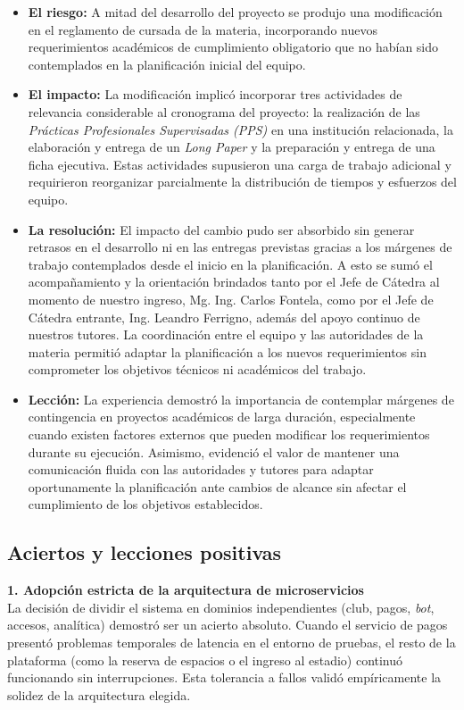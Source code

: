 \begin{itemize}
    \item \textbf{El riesgo:} A mitad del desarrollo del proyecto se produjo una modificación en el reglamento de cursada de la materia, incorporando nuevos requerimientos académicos de cumplimiento obligatorio que no habían sido contemplados en la planificación inicial del equipo.
    \item \textbf{El impacto:} La modificación implicó incorporar tres actividades de relevancia considerable al cronograma del proyecto: la realización de las \textit{Prácticas Profesionales Supervisadas (PPS)} en una institución relacionada, la elaboración y entrega de un \textit{Long Paper} y la preparación y entrega de una ficha ejecutiva. Estas actividades supusieron una carga de trabajo adicional y requirieron reorganizar parcialmente la distribución de tiempos y esfuerzos del equipo.
    \item \textbf{La resolución:} El impacto del cambio pudo ser absorbido sin generar retrasos en el desarrollo ni en las entregas previstas gracias a los márgenes de trabajo contemplados desde el inicio en la planificación. A esto se sumó el acompañamiento y la orientación brindados tanto por el Jefe de Cátedra al momento de nuestro ingreso, Mg. Ing. Carlos Fontela, como por el Jefe de Cátedra entrante, Ing. Leandro Ferrigno, además del apoyo continuo de nuestros tutores. La coordinación entre el equipo y las autoridades de la materia permitió adaptar la planificación a los nuevos requerimientos sin comprometer los objetivos técnicos ni académicos del trabajo.
    \item \textbf{Lección:} La experiencia demostró la importancia de contemplar márgenes de contingencia en proyectos académicos de larga duración, especialmente cuando existen factores externos que pueden modificar los requerimientos durante su ejecución. Asimismo, evidenció el valor de mantener una comunicación fluida con las autoridades y tutores para adaptar oportunamente la planificación ante cambios de alcance sin afectar el cumplimiento de los objetivos establecidos.
\end{itemize}

\subsection{Aciertos y lecciones positivas}

\textbf{1. Adopción estricta de la arquitectura de microservicios}\\
La decisión de dividir el sistema en dominios independientes (club, pagos, \textit{bot}, accesos, analítica) demostró ser un acierto absoluto. Cuando el servicio de pagos presentó problemas temporales de latencia en el entorno de pruebas, el resto de la plataforma (como la reserva de espacios o el ingreso al estadio) continuó funcionando sin interrupciones. Esta tolerancia a fallos validó empíricamente la solidez de la arquitectura elegida.

